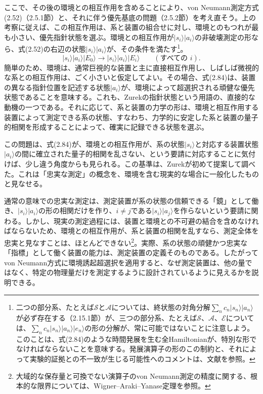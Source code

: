 ここで、その後の環境との相互作用を含めることにより、von Neumann測定方式(2.52)（2.5.1節）と、それに伴う優先基底の問題（2.5.2節）を考え直そう。上の考察に従えば、この相互作用は、系と装置の組合せに対し、環境とのもつれが最も小さい、優先指針状態を選ぶ。環境との相互作用が$\lvert s_i\rangle\lvert a_i\rangle$の非破壊測定の形なら、式(2.52)の右辺の状態$\lvert s_i\rangle\lvert a_i\rangle$が、その条件を満たす\footnote{二つの部分系、たとえば$\mathcal S$と$\mathcal A$については、終状態の対角分解$\sum_n c_n\lvert s_n\rangle\lvert a_n\rangle$が必ず存在する（2.15.1節）が、三つの部分系、たとえば$\mathcal S$、$\mathcal A$、$\mathcal E$については、$\sum_n c_n\lvert s_n\rangle\lvert a_n\rangle\lvert e_n\rangle$の形の分解が、常に可能ではないことに注意しよう。このことは、式(2.84)のような時間発展を生む全Hamiltonianが、特別な形でなければならないことを意味する。発展演算子の形のこの制約と、それによって実験的証拠との不一致が生じる可能性へのコメントは、文献\cite{ref064}を参照。}。
\begin{equation}\lvert s_i\rangle\lvert a_i\rangle\lvert E_0\rangle\longrightarrow\lvert s_i\rangle\lvert a_i\rangle\lvert E_i\rangle\qquad(\text{すべての }i).\tag{2.84}\end{equation}
簡単のため、環境は、通常巨視的な装置と主に直接相互作用し、しばしば微視的な系との相互作用は、ごく小さいと仮定してよい。その場合、式(2.84)は、装置の異なる指針位置を記述する状態$\lvert a_i\rangle$が、環境によって超選択される頑健な優先状態であることを意味する。これも、Zurekの指針状態という用語の、直接的な動機の一つである。それに応じて、系と装置の力学の形は、環境と相互作用する装置によって測定できる系の状態、すなわち、力学的に安定した系と装置の量子的相関を形成することによって、確実に記録できる状態を選ぶ\cite{ref008,ref009}。

この問題は、式(2.84)が、環境との相互作用が、系の状態$\lvert s_i\rangle$と対応する装置状態$\lvert a_i\rangle$の間に確立された量子的相関を乱さない、という要請に対応することに気付けば、少し違う角度からも見られる。この基準は、Zurek\cite{ref008}が初めて提案して調べた。これは「忠実な測定」の概念を、環境を含む現実的な場合に一般化したものと見なせる。

\hypertarget{srcpage:76}{}\label{srcpage:76}
通常の意味での忠実な測定は、測定装置が系の状態の信頼できる「鏡」として働き、$\lvert s_i\rangle\lvert a_i\rangle$の形の相関だけを作り、$i\ne j$である$\lvert s_i\rangle\lvert a_j\rangle$を作らないという要請に関わる。しかし、現実の測定過程には、装置と環境との不可避の結合を含めなければならないため、環境との相互作用が、系と装置の相関を乱すなら、測定全体を忠実と見なすことは、ほとんどできない\footnote{大域的な保存量と可換でない演算子のvon Neumann測定の精度に関する、根本的な限界については、Wigner--Araki--Yanase定理\cite{ref087,ref088}を参照。}。実際、系の状態の頑健かつ忠実な「指標」として働く装置の能力は、測定装置の定義そのものである。したがってvon Neumann方式に環境誘起超選択を適用すると、なぜ測定装置は、他の量ではなく、特定の物理量だけを測定するように設計されているように見えるかを説明できる。

